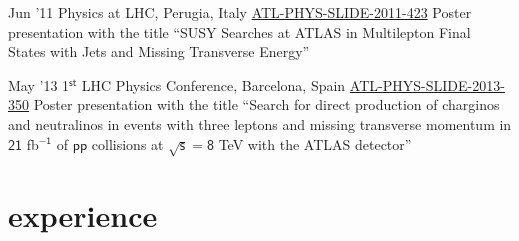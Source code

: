 \documentclass[]{cv} %
\begin{document}
\begin{entrylist}

  \entry
  {Jun '11}
  {Physics at LHC, Perugia, Italy}
  {\href{https://cds.cern.ch/record/1371922}{ATL-PHYS-SLIDE-2011-423}}
  {Poster presentation with the title ``SUSY Searches at ATLAS in Multilepton Final States with Jets and Missing Transverse Energy''}

  \entry
  {May '13}
  {1$^\mathsf{st}$ LHC Physics Conference, Barcelona, Spain}
  {\href{https://cds.cern.ch/record/1555743}{ATL-PHYS-SLIDE-2013-350}}
  {Poster presentation with the title ``Search for direct production of charginos and neutralinos in events with three
  leptons and missing transverse momentum in $\mathsf{21}$ fb$^{\mathsf{−1}}$ of $\mathsf{pp}$ collisions at $\sqrt{\mathsf{s}} = \mathsf{8}$ TeV with the ATLAS
detector''}

\end{entrylist}

\section{experience}
\end{document}
